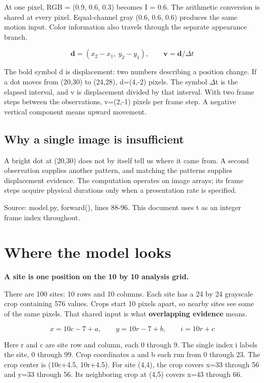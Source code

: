 \documentclass[11pt,letterpaper]{article}
\begin{document}
At one pixel, RGB = (0.9, 0.6, 0.3) becomes I = 0.6. The arithmetic conversion is shared at every pixel. Equal-channel gray (0.6, 0.6, 0.6) produces the same motion input. Color information also travels through the separate appearance branch.


\begin{equation}\mathbf d=(x_2-x_1,\ y_2-y_1),\qquad \mathbf v=\mathbf d/\Delta t\end{equation}

The bold symbol d is displacement: two numbers describing a position change. If a dot moves from (20,30) to (24,28), d=(4,-2) pixels. The symbol \(\Delta\)t is the elapsed interval, and v is displacement divided by that interval. With two frame steps between the observations, v=(2,-1) pixels per frame step. A negative vertical component means upward movement.


\subsection*{Why a single image is insufficient}

A bright dot at (20,30) does not by itself tell us where it came from. A second observation supplies another pattern, and matching the patterns supplies displacement evidence. The computation operates on image arrays; its frame steps acquire physical durations only when a presentation rate is specified.


{
\small\color{muted} Source: model.py, forward(), lines 88-96. This document uses t as an integer frame index throughout.\par}


\clearpage

\section{Where the model looks}\label{sec2}

\textbf{A site is one position on the 10 by 10 analysis grid.}


There are 100 sites: 10 rows and 10 columns. Each site has a 24 by 24 grayscale crop containing 576 values. Crops start 10 pixels apart, so nearby sites see some of the same pixels. That shared input is what \textbf{overlapping evidence} means.


\begin{equation}x=10c-7+a,\qquad y=10r-7+b,\qquad i=10r+c\end{equation}

Here r and c are site row and column, each 0 through 9. The single index i labels the site, 0 through 99. Crop coordinates a and b each run from 0 through 23. The crop center is (10c+4.5, 10r+4.5). For site (4,4), the crop covers x=33 through 56 and y=33 through 56. Its neighboring crop at (4,5) covers x=43 through 66.
\end{document}
